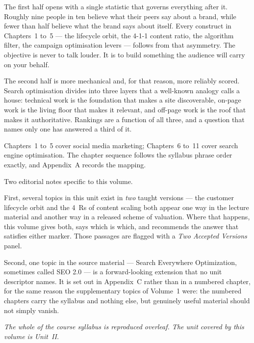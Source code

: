 \documentclass{MMTextbook}
\begin{document}
The first half opens with a single statistic that governs everything after it.
Roughly nine people in ten believe what their peers say about a brand, while
fewer than half believe what the brand says about itself. Every construct in
Chapters~1 to~5 --- the lifecycle orbit, the 4-1-1 content ratio, the algorithm
filter, the campaign optimisation levers --- follows from that asymmetry. The
objective is never to talk louder. It is to build something the audience will
carry on your behalf.

The second half is more mechanical and, for that reason, more reliably scored.
Search optimisation divides into three layers that a well-known analogy calls a
house: technical work is the foundation that makes a site discoverable, on-page
work is the living floor that makes it relevant, and off-page work is the roof
that makes it authoritative. Rankings are a function of all three, and a
question that names only one has answered a third of it.

Chapters~1 to~5 cover social media marketing; Chapters~6 to~11 cover search
engine optimisation. The chapter sequence follows the syllabus phrase order
exactly, and Appendix~A records the mapping.

Two editorial notes specific to this volume.

First, several topics in this unit exist in \emph{two} taught versions --- the
customer lifecycle orbit and the 4~Rs of content scaling both appear one way in
the lecture material and another way in a released scheme of valuation. Where
that happens, this volume gives both, says which is which, and recommends the
answer that satisfies either marker. Those passages are flagged with a
\emph{Two Accepted Versions} panel.

Second, one topic in the source material --- Search Everywhere Optimization,
sometimes called SEO 2.0 --- is a forward-looking extension that no unit
descriptor names. It is set out in Appendix~C rather than in a numbered chapter,
for the same reason the supplementary topics of Volume~1 were: the numbered
chapters carry the syllabus and nothing else, but genuinely useful material
should not simply vanish.

\vspace{12pt}
\noindent\emph{The whole of the course syllabus is reproduced overleaf. The
unit covered by this volume is Unit~II.}



\end{document}
